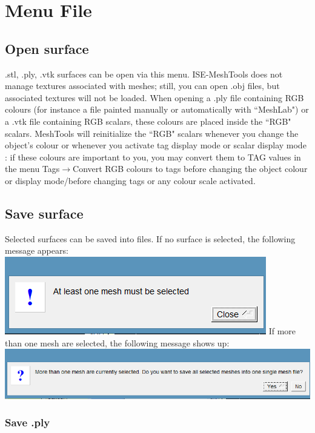 \chapter{Menu File}
\minitoc  

\section{Open surface}
.stl, .ply, .vtk surfaces can be open via this menu. ISE-MeshTools does not manage textures associated with meshes; still, you can open .obj files, but associated textures will not be loaded. When opening a .ply file containing RGB colours (for instance a file painted manually or automatically with ``MeshLab") or a .vtk file containing RGB scalars, these colours are placed inside the ``RGB" scalars. MeshTools will reinitialize the ``RGB" scalars whenever you change the object's colour or whenever you activate tag display mode or scalar display mode : if these colours are important to you, you may convert them to TAG values in the menu Tags$\rightarrow$Convert RGB colours to tags before changing the object colour or display mode/before changing tags or any colour scale activated.

\section{Save surface}
Selected surfaces can be saved into files. If no surface is selected, the following message appears:\\
\includegraphics[scale=0.5]{images/File/Save_message.png}
If more than one mesh are selected, the following message shows up:\\
\includegraphics[scale=0.5]{images/File/Save_message2.png}

\subsection{Save .ply}

